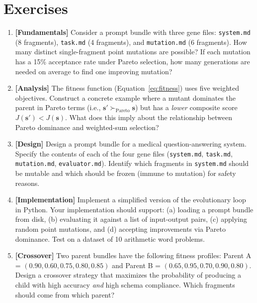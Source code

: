\section{Exercises}
\label{sec:ch12-exercises}

\begin{enumerate}[label=\textbf{12.\arabic*.}, leftmargin=2.5em]

\item \textbf{[Fundamentals]} Consider a prompt bundle with three gene files: \texttt{system.md} (8 fragments), \texttt{task.md} (4 fragments), and \texttt{mutation.md} (6 fragments). How many distinct single-fragment point mutations are possible? If each mutation has a 15\% acceptance rate under Pareto selection, how many generations are needed on average to find one improving mutation?

\item \textbf{[Analysis]} The fitness function (Equation~\ref{eq:fitness}) uses five weighted objectives. Construct a concrete example where a mutant dominates the parent in Pareto terms (i.e., $\mathbf{s}' \succ_{\text{Pareto}} \mathbf{s}$) but has a \emph{lower} composite score $J(\mathbf{s}') < J(\mathbf{s})$. What does this imply about the relationship between Pareto dominance and weighted-sum selection?

\item \textbf{[Design]} Design a prompt bundle for a medical question-answering system. Specify the contents of each of the four gene files (\texttt{system.md}, \texttt{task.md}, \texttt{mutation.md}, \texttt{evaluator.md}). Identify which fragments in \texttt{system.md} should be mutable and which should be frozen (immune to mutation) for safety reasons.

\item \textbf{[Implementation]} Implement a simplified version of the evolutionary loop in Python. Your implementation should support: (a) loading a prompt bundle from disk, (b) evaluating it against a list of input-output pairs, (c) applying random point mutations, and (d) accepting improvements via Pareto dominance. Test on a dataset of 10 arithmetic word problems.

\item \textbf{[Crossover]} Two parent bundles have the following fitness profiles: Parent A = $(0.90, 0.60, 0.75, 0.80, 0.85)$ and Parent B = $(0.65, 0.95, 0.70, 0.90, 0.80)$. Design a crossover strategy that maximizes the probability of producing a child with high accuracy \emph{and} high schema compliance. Which fragments should come from which parent?


\end{enumerate}
